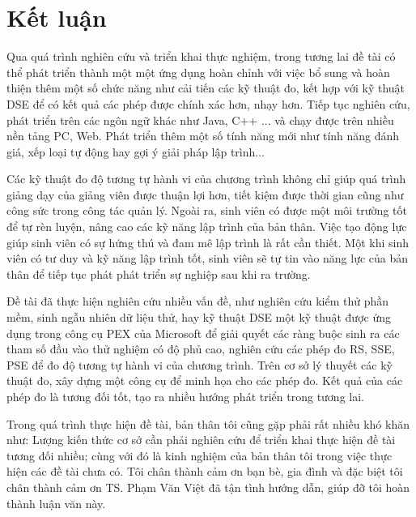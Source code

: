 \section{Kết luận}
Qua quá trình nghiên cứu và triển khai thực nghiệm, trong tương lai đề
tài có thể phát triển thành một một ứng dụng hoàn chỉnh với việc bổ
sung và hoàn thiện thêm một số chức năng như cải tiến các kỹ thuật đo, kết hợp với kỹ thuật DSE để có kết quả các phép được chính xác hơn, nhạy hơn. Tiếp tục nghiên cứu, phát triển trên các ngôn ngữ khác như Java, C++ ... và chạy được trên
nhiều nền tảng PC, Web. Phát triển thêm một số tính năng mới như tính năng đánh giá, xếp loại tự động hay gợi ý giải pháp lập trình...

Các kỹ thuật đo độ tương tự hành vi của chương trình không chỉ giúp quá trình giảng dạy của giảng viên được thuận lợi hơn, tiết kiệm được thời gian cũng như công sức trong công tác quản lý. Ngoài ra, sinh viên có được một môi trường tốt
để tự rèn luyện, nâng cao các kỹ năng lập trình của bản thân. Việc tạo
động lực giúp sinh viên có sự hứng thú và đam mê lập trình là rất cần
thiết. Một khi sinh viên có tư duy và kỹ năng lập trình tốt, sinh viên
sẽ tự tin vào năng lực của bản thân để tiếp tục phát phát triển sự
nghiệp sau khi ra trường.

Đề tài đã thực hiện nghiên cứu nhiều vấn đề, như nghiên cứu kiểm thử
phần mềm, sinh ngẫu nhiên dữ liệu thử, hay kỹ thuật DSE một kỹ thuật
được ứng dụng trong công cụ PEX của Microsoft để giải quyết các ràng
buộc sinh ra các tham số đầu vào thử nghiệm có độ phủ cao, nghiên cứu
các phép đo RS, SSE, PSE để đo độ tương tự hành vi của chương
trình. Trên cơ sở lý thuyết các kỹ thuật đo, xây dựng một công cụ để
minh họa cho các phép đo. Kết quả của các phép đo là tương đối tốt,
tạo ra nhiều hướng phát triển trong tương lai.

Trong quá trình thực hiện đề tài, bản thân tôi cũng gặp phải rất nhiều
khó khăn như: Lượng kiến thức cơ sở cần phải nghiên cứu để triển khai
thực hiện đề tài tương đối nhiều; cùng với đó là kinh nghiệm của bản thân
tôi trong việc thực hiện các đề tài chưa có. Tôi chân thành cảm ơn bạn bè, gia đình và đặc biệt tôi chân thành cảm ơn TS. Phạm Văn Việt đã tận tình hướng dẫn, giúp đỡ tôi hoàn thành luận văn này.

